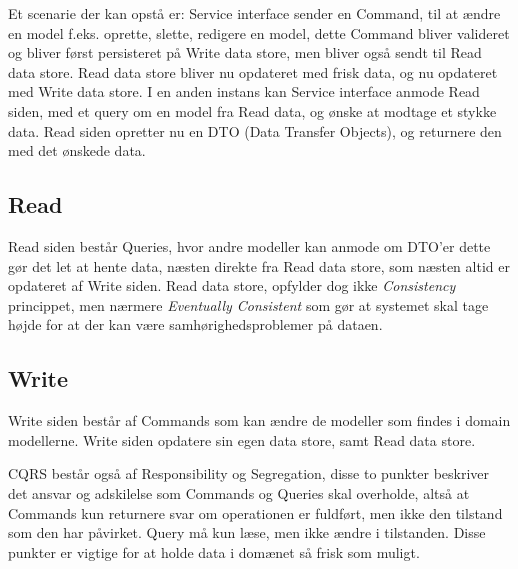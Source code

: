 Et scenarie der kan opstå er: Service interface sender en Command, til at ændre en model f.eks. oprette, slette, redigere en model, dette Command bliver valideret og bliver først persisteret på Write data store, men bliver også sendt til Read data store. Read data store bliver nu opdateret med frisk data, og nu opdateret med Write data store. I en anden instans kan Service interface anmode Read siden, med et query om en model fra Read data, og ønske at modtage et stykke data. Read siden opretter nu en DTO (Data Transfer Objects), og returnere den med det ønskede data.
\subsection{Read}

Read siden består Queries, hvor andre modeller kan anmode om DTO'er dette gør det let at hente data, næsten direkte fra Read data store, som næsten altid er opdateret af Write siden. Read data store, opfylder dog ikke \textit{Consistency} princippet, men nærmere \textit{Eventually Consistent} som gør at systemet skal tage højde for at der kan være samhørighedsproblemer på dataen. 
\subsection{Write}

Write siden består af Commands som kan ændre de modeller som findes i domain modellerne. Write siden opdatere sin egen data store, samt Read data store.\newline

CQRS består også af Responsibility og Segregation, disse to punkter beskriver det ansvar og adskilelse som Commands og Queries skal overholde, altså at Commands kun returnere svar om operationen er fuldført, men ikke den tilstand som den har påvirket. Query må kun læse, men ikke ændre i tilstanden. Disse punkter er vigtige for at holde data i domænet så frisk som muligt.
